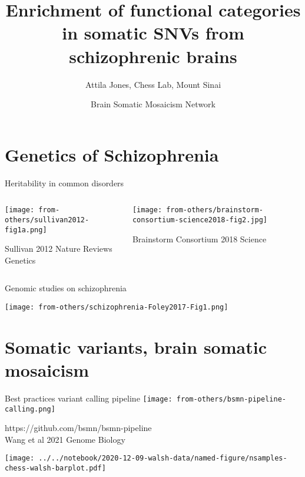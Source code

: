 \documentclass[usenames,dvipsnames]{beamer}
\title{Enrichment of functional categories in somatic SNVs from schizophrenic
brains}
\author{Attila Jones, Chess Lab, Mount Sinai}
\date{Brain Somatic Mosaicism Network}
\begin{document}
\maketitle

\section{Genetics of Schizophrenia}

\begin{frame}{Heritability in common disorders}
\begin{columns}[t]
\begin{column}{0.4\textwidth}

\texttt{[image: from-others/sullivan2012-fig1a.png]}

{\tiny Sullivan 2012 Nature Reviews Genetics}
\end{column}

\begin{column}{0.6\textwidth}

\texttt{[image: from-others/brainstorm-consortium-science2018-fig2.jpg]}

{\tiny Brainstorm Consortium 2018 Science}
\end{column}
\end{columns}
\end{frame}

\begin{frame}{Genomic studies on schizophrenia}
\begin{center}
\texttt{[image: from-others/schizophrenia-Foley2017-Fig1.png]}
\end{center}
\end{frame}

\section{Somatic variants, brain somatic mosaicism}

\begin{frame}{Best practices variant calling pipeline}
\texttt{[image: from-others/bsmn-pipeline-calling.png]}

{\tiny https://github.com/bsmn/bsmn-pipeline \\
	Wang et al 2021 Genome Biology}
\end{frame}

\begin{frame}
\begin{center}
\texttt{[image: ../../notebook/2020-12-09-walsh-data/named-figure/nsamples-chess-walsh-barplot.pdf]}
\end{center}
\end{frame}
\end{document}

